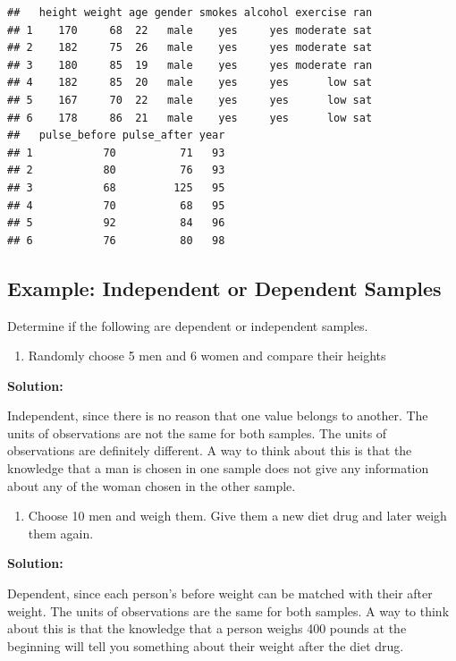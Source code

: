 \documentclass[
]{book}
\providecommand{\tightlist}{%
  \setlength{\itemsep}{0pt}\setlength{\parskip}{0pt}}
\begin{document}
\begin{verbatim}
##   height weight age gender smokes alcohol exercise ran
## 1    170     68  22   male    yes     yes moderate sat
## 2    182     75  26   male    yes     yes moderate sat
## 3    180     85  19   male    yes     yes moderate ran
## 4    182     85  20   male    yes     yes      low sat
## 5    167     70  22   male    yes     yes      low sat
## 6    178     86  21   male    yes     yes      low sat
##   pulse_before pulse_after year
## 1           70          71   93
## 2           80          76   93
## 3           68         125   95
## 4           70          68   95
## 5           92          84   96
## 6           76          80   98
\end{verbatim}

\hypertarget{example-independent-or-dependent-samples}{%
\subsection{Example: Independent or Dependent Samples}\label{example-independent-or-dependent-samples}}

Determine if the following are dependent or independent samples.

\begin{enumerate}
\def\labelenumi{\alph{enumi}.}
\tightlist
\item
  Randomly choose 5 men and 6 women and compare their heights
\end{enumerate}

\textbf{Solution:}

Independent, since there is no reason that one value belongs to another. The units of observations are not the same for both samples. The units of observations are definitely different. A way to think about this is that the knowledge that a man is chosen in one sample does not give any information about any of the woman chosen in the other sample.

\begin{enumerate}
\def\labelenumi{\alph{enumi}.}
\setcounter{enumi}{1}
\tightlist
\item
  Choose 10 men and weigh them. Give them a new diet drug and later weigh them again.
\end{enumerate}

\textbf{Solution:}

Dependent, since each person's before weight can be matched with their after weight. The units of observations are the same for both samples. A way to think about this is that the knowledge that a person weighs 400 pounds at the beginning will tell you something about their weight after the diet drug.
\end{document}

